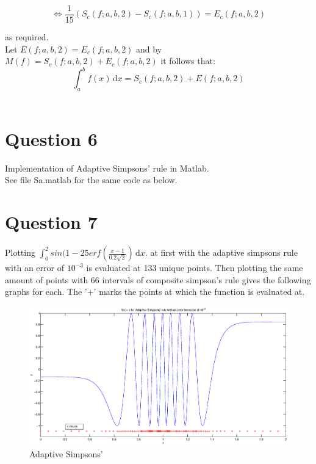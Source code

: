 \documentclass[fleqn]{report}
\begin{document}
\begin{equation*}
\iff \frac{1}{15}(S_c(f;a,b,2) - S_c(f;a,b,1)) = E_c(f;a,b,2)
\end{equation*}

as required.\\

\noindent Let $E(f;a,b,2) = E_c(f;a,b,2)$ and by $M(f) = S_c(f;a,b,2) + E_c(f;a,b,2)$ 
it follows that:\\

\begin{equation*}
\int_a^b \! f(x) \, \mathrm{d}x  = S_c(f;a,b,2) + E(f;a,b,2)
\end{equation*}
\\


\pagebreak

\section{Question 6}
Implementation of Adaptive Simpsons' rule in Matlab. \\

See file Sa.matlab for the same code as below.



\pagebreak

\section{Question 7}

Plotting $ \int_0^2 \! sin(1 - 25erf(\frac{x-1}{0.2\sqrt{2}}) \,\mathrm{d}x.$ 
at first with the adaptive simpsons rule with an error of $10^{-3}$ is evaluated at 
133 unique points. Then plotting the same amount of points with 66 intervals of composite 
simpson's rule gives the following graphs for each. The '+' marks the points at which
the function is evaluated at.

\begin{figure}[h!]
\begin{center}
    \centerline{\includegraphics[width=1.8\textwidth]{graphs/q7adaptive.eps}}
    \caption{Adaptive Simpsons'}
\end{center}
\end{figure}
\end{document}
